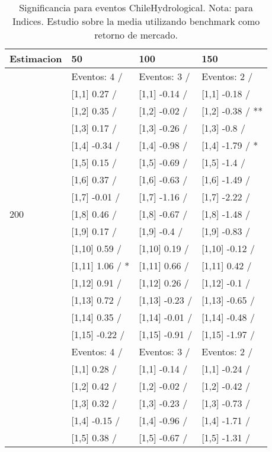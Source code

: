 \begin{table}

\caption{Significancia para eventos ChileHydrological. Nota: para Indices. Estudio sobre la media utilizando benchmark como retorno de mercado.}
\centering
\begin{tabular}[t]{llll}
\toprule
Estimacion & 50 & 100 & 150\\
\midrule
 & Eventos:  4 / & Eventos:  3 / & Eventos:  2 /\\
 & {}[1,1] 0.27  / & {}[1,1] -0.14  / & {}[1,1] -0.18  /\\
 & {}[1,2] 0.35  / & {}[1,2] -0.02  / & {}[1,2] -0.38  / **\\
 & {}[1,3] 0.17  / & {}[1,3] -0.26  / & {}[1,3] -0.8  /\\
 & {}[1,4] -0.34  / & {}[1,4] -0.98  / & {}[1,4] -1.79  / *\\
\addlinespace
 & {}[1,5] 0.15  / & {}[1,5] -0.69  / & {}[1,5] -1.4  /\\
 & {}[1,6] 0.37  / & {}[1,6] -0.63  / & {}[1,6] -1.49  /\\
 & {}[1,7] -0.01  / & {}[1,7] -1.16  / & {}[1,7] -2.22  /\\
200 & {}[1,8] 0.46  / & {}[1,8] -0.67  / & {}[1,8] -1.48  /\\
 & {}[1,9] 0.17  / & {}[1,9] -0.4  / & {}[1,9] -0.83  /\\
\addlinespace
 & {}[1,10] 0.59  / & {}[1,10] 0.19  / & {}[1,10] -0.12  /\\
 & {}[1,11] 1.06  / * & {}[1,11] 0.66  / & {}[1,11] 0.42  /\\
 & {}[1,12] 0.91  / & {}[1,12] 0.26  / & {}[1,12] -0.1  /\\
 & {}[1,13] 0.72  / & {}[1,13] -0.23  / & {}[1,13] -0.65  /\\
 & {}[1,14] 0.35  / & {}[1,14] -0.01  / & {}[1,14] -0.48  /\\
\addlinespace
 & {}[1,15] -0.22  / & {}[1,15] -0.91  / & {}[1,15] -1.97  /\\
 & Eventos:  4 / & Eventos:  3 / & Eventos:  2 /\\
 & {}[1,1] 0.28  / & {}[1,1] -0.14  / & {}[1,1] -0.24  /\\
 & {}[1,2] 0.42  / & {}[1,2] -0.02  / & {}[1,2] -0.42  /\\
 & {}[1,3] 0.32  / & {}[1,3] -0.23  / & {}[1,3] -0.73  /\\
\addlinespace
 & {}[1,4] -0.15  / & {}[1,4] -0.96  / & {}[1,4] -1.71  /\\
 & {}[1,5] 0.38  / & {}[1,5] -0.67  / & {}[1,5] -1.31  /\\

\end{tabular}
\end{table}

